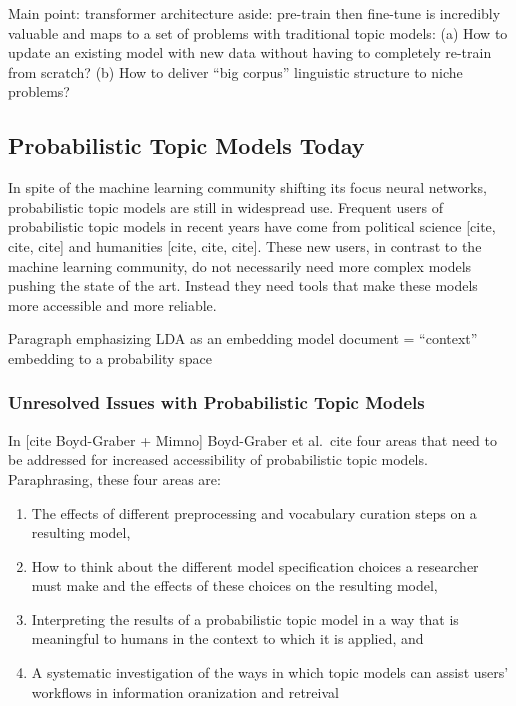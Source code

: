\documentclass[conference,final,]{IEEEtran}
\providecommand{\tightlist}{%
  \setlength{\itemsep}{0pt}\setlength{\parskip}{0pt}}
\begin{document}
Main point: transformer architecture aside: pre-train then fine-tune is
incredibly valuable and maps to a set of problems with traditional topic
models: (a) How to update an existing model with new data without having
to completely re-train from scratch? (b) How to deliver ``big corpus''
linguistic structure to niche problems?

\hypertarget{probabilistic-topic-models-today}{%
\subsection{Probabilistic Topic Models
Today}\label{probabilistic-topic-models-today}}

In spite of the machine learning community shifting its focus neural
networks, probabilistic topic models are still in widespread use.
Frequent users of probabilistic topic models in recent years have come
from political science {[}cite, cite, cite{]} and humanities {[}cite,
cite, cite{]}. These new users, in contrast to the machine learning
community, do not necessarily need more complex models pushing the state
of the art. Instead they need tools that make these models more
accessible and more reliable.

Paragraph emphasizing LDA as an embedding model document = ``context''
embedding to a probability space

\hypertarget{unresolved-issues-with-probabilistic-topic-models}{%
\subsubsection{Unresolved Issues with Probabilistic Topic
Models}\label{unresolved-issues-with-probabilistic-topic-models}}

In {[}cite Boyd-Graber + Mimno{]} Boyd-Graber et al.~cite four areas
that need to be addressed for increased accessibility of probabilistic
topic models. Paraphrasing, these four areas are:

\begin{enumerate}
\def\labelenumi{\arabic{enumi}.}
\tightlist
\item
  The effects of different preprocessing and vocabulary curation steps
  on a resulting model,
\item
  How to think about the different model specification choices a
  researcher must make and the effects of these choices on the resulting
  model,
\item
  Interpreting the results of a probabilistic topic model in a way that
  is meaningful to humans in the context to which it is applied, and
\item
  A systematic investigation of the ways in which topic models can
  assist users' workflows in information oranization and retreival
\end{enumerate}
\end{document}

